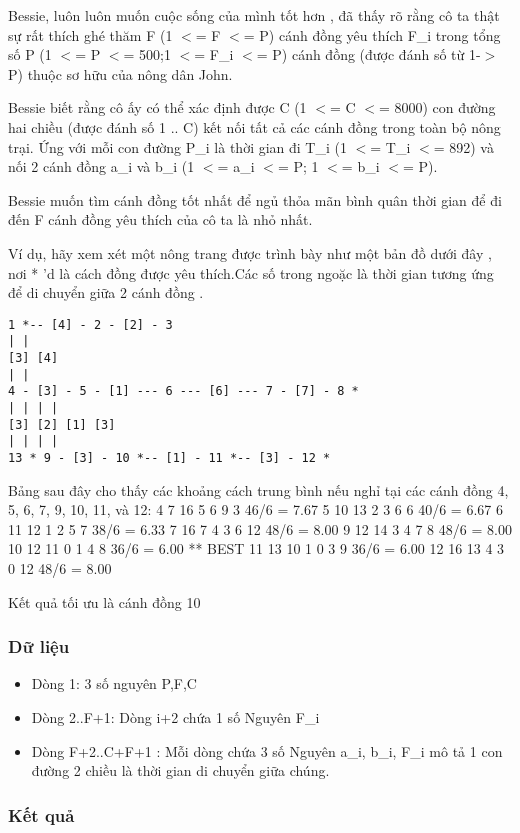 



   Bessie, luôn luôn muốn cuộc sống của mình tốt hơn , đã thấy rõ rằng cô ta thật sự rất thích ghé thăm F (1 $<$= F $<$= P) cánh đồng yêu thích F\_i trong tổng số P (1 $<$= P $<$= 500;1 $<$= F\_i $<$= P) cánh đồng (được đánh số từ 1-$>$ P) thuộc sơ hữu của nông dân John.  

   Bessie biết rằng cô ấy có thể xác định được C (1 $<$= C $<$= 8000) con đường hai chiều (được đánh số 1 .. C) kết nối tất cả các cánh đồng trong toàn bộ nông trại. Ứng với mỗi con đường P\_i là thời gian đi T\_i (1 $<$= T\_i $<$= 892) và nối 2 cánh đồng a\_i và b\_i (1 $<$= a\_i $<$= P; 1 $<$= b\_i $<$= P).  

   Bessie muốn tìm cánh đồng tốt nhất để ngủ thỏa mãn bình quân thời gian để đi đến F cánh đồng yêu thích của cô ta là nhỏ nhất.  

   Ví dụ, hãy xem xét một nông trang được trình bày như một bản đồ dưới đây , nơi * 'd là cách đồng được yêu thích.Các số trong ngoặc là thời gian tương ứng để di chuyển giữa 2 cánh đồng .  
\begin{verbatim}
1 *-- [4] - 2 - [2] - 3
| |
[3] [4]
| |
4 - [3] - 5 - [1] --- 6 --- [6] --- 7 - [7] - 8 *
| | | |
[3] [2] [1] [3]
| | | |
13 * 9 - [3] - 10 *-- [1] - 11 *-- [3] - 12 *
\end{verbatim}

   Bảng sau đây cho thấy các khoảng cách trung bình nếu nghỉ tại các cánh đồng 4, 5, 6, 7, 9, 10, 11, và 12: 4 7 16 5 6 9 3 46/6 = 7.67 5 10 13 2 3 6 6 40/6 = 6.67 6 11 12 1 2 5 7 38/6 = 6.33 7 16 7 4 3 6 12 48/6 = 8.00 9 12 14 3 4 7 8 48/6 = 8.00 10 12 11 0 1 4 8 36/6 = 6.00 ** BEST 11 13 10 1 0 3 9 36/6 = 6.00 12 16 13 4 3 0 12 48/6 = 8.00  

   Kết quả tối ưu là cánh đồng 10  

\subsubsection{   Dữ liệu  }
\begin{itemize}
	\item     Dòng 1: 3 số nguyên P,F,C   
	\item     Dòng 2..F+1: Dòng i+2 chứa 1 số Nguyên F\_i   
	\item     Dòng F+2..C+F+1 : Mỗi dòng chứa 3 số Nguyên a\_i, b\_i, F\_i mô tả 1 con đường 2 chiều là thời gian di chuyển giữa chúng.   
\end{itemize}

\subsubsection{   Kết quả  }

